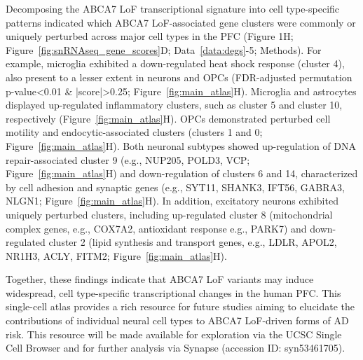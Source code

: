 Decomposing the ABCA7 LoF transcriptional signature into cell type-specific patterns indicated which ABCA7 LoF-associated gene clusters were commonly or uniquely perturbed across major cell types in the PFC (Figure 1H; Figure~\ref{fig:snRNAseq_gene_scores}D; Data~\ref{data:degs}-5; Methods). For example, microglia exhibited a down-regulated heat shock response (cluster 4), also present to a lesser extent in neurons and OPCs (FDR-adjusted permutation p-value<0.01 & |score|>0.25; Figure~\ref{fig:main_atlas}H). Microglia and astrocytes displayed up-regulated inflammatory clusters, such as cluster 5 and cluster 10, respectively (Figure~\ref{fig:main_atlas}H). OPCs demonstrated perturbed cell motility and endocytic-associated clusters (clusters 1 and 0; Figure~\ref{fig:main_atlas}H). Both neuronal subtypes showed up-regulation of DNA repair-associated cluster 9 (e.g., NUP205, POLD3, VCP; Figure~\ref{fig:main_atlas}H) and down-regulation of clusters 6 and 14, characterized by cell adhesion and synaptic genes (e.g., SYT11, SHANK3, IFT56, GABRA3, NLGN1; Figure~\ref{fig:main_atlas}H). In addition, excitatory neurons exhibited uniquely perturbed clusters, including up-regulated cluster 8 (mitochondrial complex genes, e.g., COX7A2, antioxidant response e.g., PARK7) and down-regulated cluster 2 (lipid synthesis and transport genes, e.g., LDLR, APOL2, NR1H3, ACLY, FITM2; Figure~\ref{fig:main_atlas}H).

Together, these findings indicate that ABCA7 LoF variants may induce widespread, cell type-specific transcriptional changes in the human PFC. This single-cell atlas provides a rich resource for future studies aiming to elucidate the contributions of individual neural cell types to ABCA7 LoF-driven forms of AD risk. This resource will be made available for exploration via the UCSC Single Cell Browser and for further analysis via Synapse (accession ID: syn53461705).

